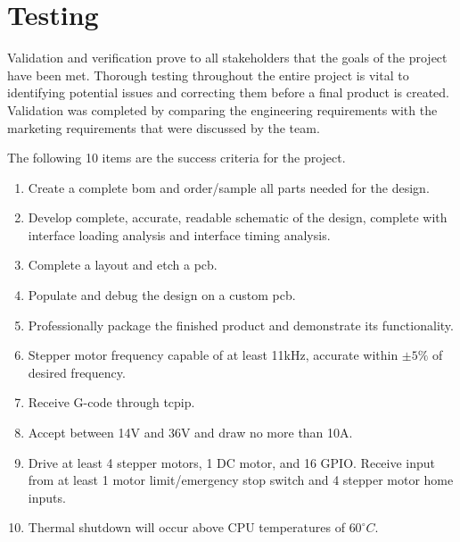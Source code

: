 \newcommand{\testheader}{\textrotate{\textbf{Step}} & \textbf{Action} & \textbf{Expected Result} & \textrotate{\textbf{Pass}} & \textrotate{\textbf{Fail}} & \textrotate{\textbf{N/A}} & \textbf{Comments} \\ \hline}
\newcommand{\testinfo}[2]{\multicolumn{2}{|r|}{\textbf{Test Case Name:}} & \multicolumn{5}{m{11cm}|}{#1} \\ \hline \multicolumn{2}{|r|}{\textbf{Description:}} & \multicolumn{5}{m{11cm}|}{#2} \\ \hline}
\newcommand{\testerinfo}{\multicolumn{2}{|r|}{\textbf{Name of Tester:}} & & \multicolumn{3}{l|}{\textbf{Date:}} & \\ \hline \multicolumn{2}{|r|}{\textbf{HW/SW Version:}} & & \multicolumn{3}{l|}{\textbf{Time:}} & \\ \hline}
\newcommand{\testsetup}[1]{\multicolumn{2}{|r|}{\textbf{Setup:}} & \multicolumn{5}{m{11cm}|}{#1} \\ \hline}
\newcommand{\testtabular}[3]{\begin{tabular}{|m{.25cm}|m{4cm}|m{5cm}|m{.25cm}|m{.25cm}|m{.25cm}|m{3cm}|}\hline\testinfo{#1}{#2}\testerinfo\testsetup{#3}\testheader}

\chapter{Testing}
Validation and verification prove to all stakeholders that the goals of the project have been met.
Thorough testing throughout the entire project is vital to identifying potential issues and correcting them before a final product is created. 
Validation was completed by comparing the engineering requirements with the marketing requirements that were discussed by the team. 

The following 10 items are the success criteria for the project. 
\begin{enumerate}
	\item Create a complete \gls{bom} and order/sample all parts needed for the design.
	\item Develop complete, accurate, readable schematic of the design, complete with interface loading analysis and interface timing analysis. 
	\item Complete a layout and etch a \gls{pcb}.
	\item Populate and debug the design on a custom \gls{pcb}.
	\item Professionally package the finished product and demonstrate its functionality.
	\item Stepper motor frequency capable of at least 11kHz, accurate within $\pm5\%$ of desired frequency.
	\item Receive G-code through \gls{tcpip}.
	\item Accept between 14V and 36V and draw no more than 10A.
	\item Drive at least 4 stepper motors, 1 DC motor, and 16 GPIO. Receive input from at least 1 motor limit/emergency stop switch and 4 stepper motor home inputs.
	\item Thermal shutdown will occur above CPU temperatures of $60^{\circ}C$.
\end{enumerate}

